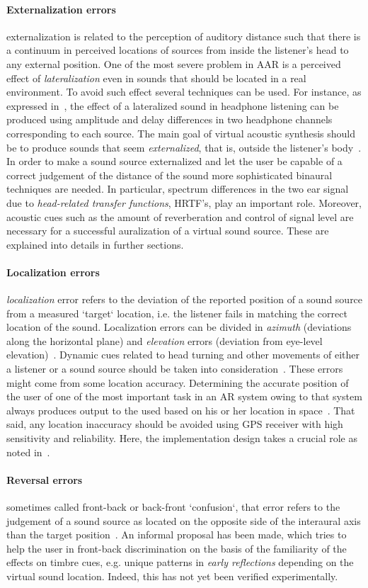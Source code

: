 \documentclass[journal]{IEEEtran}
\begin{document}
\paragraph{Externalization errors}
externalization is related to the perception of auditory distance such that there is a continuum in perceived locations of sources from inside the listener's head to any external position. One of the most severe problem in AAR is a perceived effect of \emph{lateralization} even in sounds that should be located in a real environment. To avoid such effect several techniques can be used. For instance, as expressed in~\cite{}, the effect of a lateralized sound in headphone listening can be produced using amplitude and delay differences in two headphone channels corresponding to each source. The main goal of virtual acoustic synthesis should be to produce sounds that seem \emph{externalized}, that is, outside the listener's body~\cite{}. In order to make a sound source externalized and let the user be capable of a correct judgement of the distance of the sound more sophisticated binaural techniques are needed. In particular, spectrum differences in the two ear signal due to \emph{head-related transfer functions}, HRTF's, play an important role. Moreover, acoustic cues such as the amount of reverberation and control of signal level are necessary for a successful auralization of a virtual sound source. These are explained into details in further sections.
\paragraph{Localization errors}
\emph{localization} error refers to the deviation of the reported position of a sound source from a measured `target` location, i.e. the listener fails in matching the correct location of the sound. Localization errors can be divided in \emph{azimuth} (deviations along the horizontal plane) and \emph{elevation} errors (deviation from eye-level elevation)~\cite{}. Dynamic cues related to head turning and other movements of either a listener or a sound source should be taken into consideration~\cite{}. These errors might come from some location accuracy. Determining the accurate position of the user of one of the most important task in an AR system owing to that system always produces output to the used based on his or her location in space~\cite{}. That said, any location inaccuracy should be avoided using GPS receiver with high sensitivity and reliability. Here, the implementation design takes a crucial role as noted in~\cite{}.
\paragraph{Reversal errors}
sometimes called front-back or back-front `confusion`, that error refers to the judgement of a sound source as located on the opposite side of the interaural axis than the target position~\cite{}. An informal proposal has been made, which tries to help the user in front-back discrimination on the basis of the familiarity of the effects on timbre cues, e.g. unique patterns in \emph{early reflections} depending on the virtual sound location. Indeed, this has not yet been verified experimentally.
\end{document}
